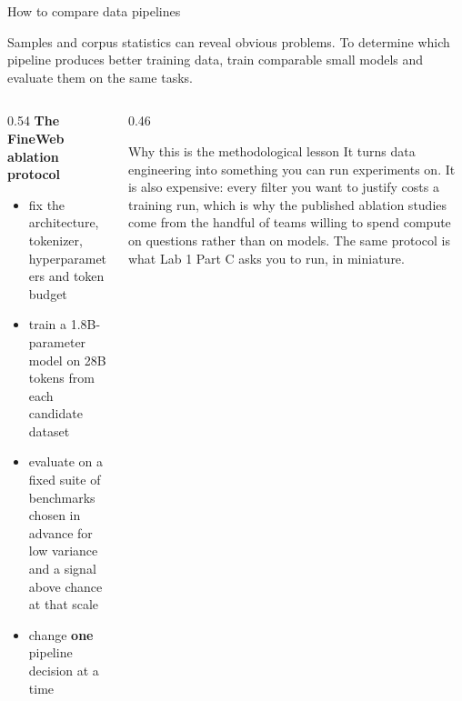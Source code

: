 \documentclass[aspectratio=169,10pt]{beamer}
\begin{document}
\begin{frame}[shrink=9]{How to compare data pipelines}
  \begin{gotcha}
    Samples and corpus statistics can reveal obvious problems. To determine
    which pipeline produces better training data, train comparable small models
    and evaluate them on the same tasks.
  \end{gotcha}
  \vspace{0.5em}
  \begin{columns}[T]
    \begin{column}{0.54\textwidth}
      \textbf{The FineWeb ablation protocol}
      \begin{itemize}
        \item fix the architecture, tokenizer, hyperparameters and token budget
        \item train a 1.8B-parameter model on 28B tokens from each candidate
          dataset
        \item evaluate on a fixed suite of benchmarks chosen in advance for
          low variance and a signal above chance at that scale
        \item change \textbf{one} pipeline decision at a time
      \end{itemize}
    \end{column}
    \begin{column}{0.46\textwidth}
      \begin{block}{Why this is the methodological lesson}
        \small
        It turns data engineering into something you can run experiments on.
        \vspace{0.4em}
        It is also expensive: every filter you want to justify costs a training
        run, which is why the published ablation studies come from the handful
        of teams willing to spend compute on questions rather than on models.
        \vspace{0.4em}
        The same protocol is what Lab 1 Part C asks you to run, in miniature.
      \end{block}
    \end{column}
  \end{columns}
\end{frame}
\end{document}
